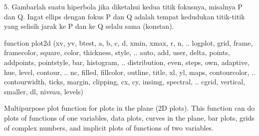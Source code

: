 \documentclass[a4paper,10pt]{article}
\begin{document}
\begin{eulernotebook}
\begin{eulercomment}
\begin{eulercomment}
\begin{eulercomment}
\begin{eulercomment}
\begin{eulercomment}
\begin{eulercomment}
\begin{eulercomment}
\begin{eulercomment}
\begin{eulercomment}
\begin{eulercomment}
\begin{eulercomment}
\begin{eulercomment}
\begin{eulercomment}
\begin{eulercomment}
\begin{eulercomment}
\begin{eulercomment}
\begin{eulercomment}
\begin{eulercomment}
\begin{eulercomment}
\begin{eulercomment}
\begin{eulercomment}
\begin{eulercomment}
\begin{eulercomment}
\begin{eulercomment}
\begin{eulercomment}
\begin{eulercomment}
\begin{eulercomment}
\begin{eulercomment}
\begin{eulercomment}
\begin{eulercomment}
\begin{eulercomment}
\begin{eulercomment}
\begin{eulercomment}
\begin{eulercomment}
\begin{eulercomment}
5. Gambarlah suatu hiperbola jika diketahui kedua titik fokusnya, misalnya P dan Q. Ingat
ellips dengan fokus P dan Q adalah tempat kedudukan titik-titik yang selisih jarak ke P dan
ke Q selalu sama (konstan).
\begin{eulercomment}
\begin{eulercomment}
\end{eulercomment}
\begin{eulerttcomment}
  function plot2d (xv, yv, btest, a, b, c, d, xmin, xmax, r, n,  ..
  logplot, grid, frame, framecolor, square, color, thickness, style, ..
  auto, add, user, delta, points, addpoints, pointstyle, bar, histogram,  ..
  distribution, even, steps, own, adaptive, hue, level, contour,  ..
  nc, filled, fillcolor, outline, title, xl, yl, maps, contourcolor, ..
  contourwidth, ticks, margin, clipping, cx, cy, insimg, spectral,  ..
  cgrid, vertical, smaller, dl, niveau, levels)
\end{eulerttcomment}
\begin{eulercomment}
Multipurpose plot function for plots in the plane (2D plots). This function can do
plots of functions of one variables, data plots, curves in the plane, bar plots, grids
of complex numbers, and implicit plots of functions of two variables.


\end{eulercomment}
\end{eulercomment}
\end{eulercomment}
\end{eulercomment}
\end{eulercomment}
\end{eulercomment}
\end{eulercomment}
\end{eulercomment}
\end{eulercomment}
\end{eulercomment}
\end{eulercomment}
\end{eulercomment}
\end{eulercomment}
\end{eulercomment}
\end{eulercomment}
\end{eulercomment}
\end{eulercomment}
\end{eulercomment}
\end{eulercomment}
\end{eulercomment}
\end{eulercomment}
\end{eulercomment}
\end{eulercomment}
\end{eulercomment}
\end{eulercomment}
\end{eulercomment}
\end{eulercomment}
\end{eulercomment}
\end{eulercomment}
\end{eulercomment}
\end{eulercomment}
\end{eulercomment}
\end{eulercomment}
\end{eulercomment}
\end{eulercomment}
\end{eulercomment}
\end{eulercomment}
\end{eulernotebook}
\end{document}
